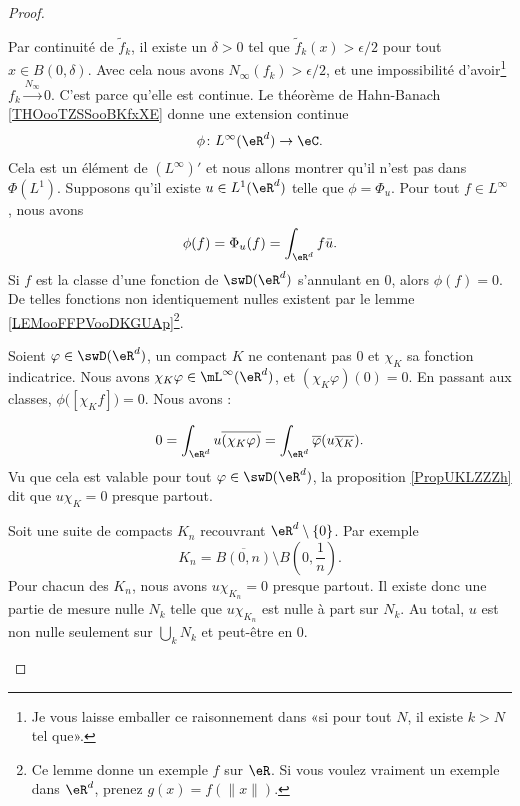 \begin{proof}
\begin{subproof}
		Par continuité de \( \tilde f_k\), il existe un \( \delta>0\) tel que \( \tilde f_k(x)>\epsilon/2\) pour tout \( x\in B(0,\delta)\). Avec cela nous avons \( N_{\infty}(f_k)>\epsilon/2\), et une impossibilité d'avoir\footnote{Je vous laisse emballer ce raisonnement dans «si pour tout \( N\), il existe \( k>N\) tel que».} \( f_k\stackrel{N_{\infty}}{\longrightarrow}0\).
		C'est parce qu'elle est continue.
		Le théorème de Hahn-Banach \ref{THOooTZSSooBKfxXE} donne une extension continue
		\begin{equation}
			\phi\colon L^{\infty}(\eR^d)\to \eC.
		\end{equation}
		Cela est un élément de \( (L^{\infty})'\) et nous allons montrer qu'il n'est pas dans \( \Phi(L^1)\).
		Supposons qu'il existe \( u\in L^1(\eR^d)\) telle que \( \phi=\Phi_u\). Pour tout \( f\in L^{\infty}\), nous avons
		\begin{equation}
			\phi(f)=\Phi_u(f)=\int_{\eR^d}f\bar u.
		\end{equation}
		Si \( f\) est la classe d'une fonction de \( \swD(\eR^d)\) s'annulant en \( 0\), alors \( \phi(f)=0\). De telles fonctions non identiquement nulles existent par le lemme \ref{LEMooFFPVooDKGUAp}\footnote{Ce lemme donne un exemple \( f\) sur \( \eR\). Si vous voulez vraiment un exemple dans \( \eR^d\), prenez \( g(x)=f(\| x \|)\).}.


		Soient \( \varphi\in \swD(\eR^d)\), un compact \( K\) ne contenant pas \( 0\) et \( \chi_K\) sa fonction indicatrice. Nous avons \( \chi_K\varphi\in \mL^{\infty}(\eR^d)\), et \( (\chi_K\varphi)(0)=0\). En passant aux classes, \( \phi\big( [\chi_Kf] \big)=0\). Nous avons :

		\begin{equation}
			0=\int_{\eR^d}u\overline{ (\chi_K\varphi) }=\int_{\eR^d}\overline{ \varphi }(u\overline{ \chi_K }).
		\end{equation}
		Vu que cela est valable pour tout \( \varphi\in \swD(\eR^d)\), la proposition \ref{PropUKLZZZh} dit que \( u\chi_K=0\) presque partout.


		Soit une suite de compacts \( K_n\) recouvrant \( \eR^d\setminus\{ 0 \}\). Par exemple
		\begin{equation}
			K_n=\overline{ B(0,n) }\setminus B(0,\frac{1}{ n }).
		\end{equation}
		Pour chacun des \( K_n\), nous avons \( u\chi_{K_n}=0\) presque partout. Il existe donc une partie de mesure nulle \( N_k\) telle que \( u\chi_{K_n}\) est nulle à part sur \( N_k\). Au total, \( u\) est non nulle seulement sur \( \bigcup_{k}N_k\) et peut-être en \( 0\).


\end{subproof}
\end{proof}
